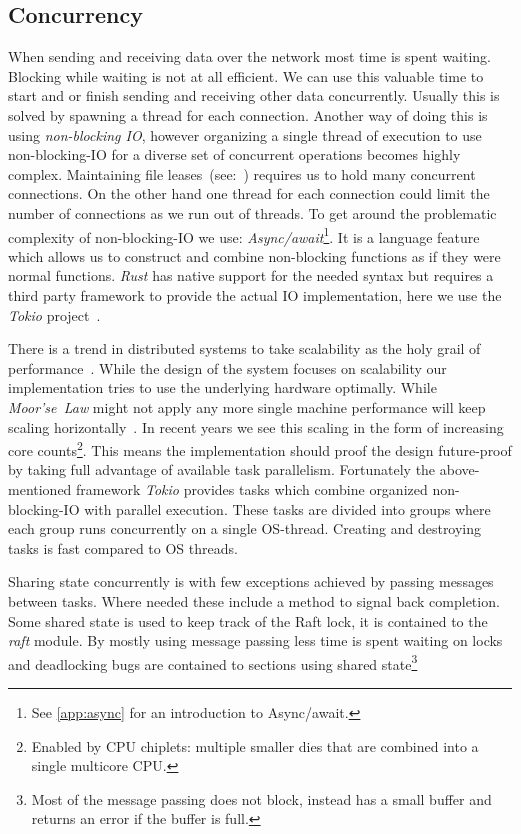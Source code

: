 \subsection{Concurrency}
When sending and receiving data over the network most time is spent waiting. Blocking while waiting is not at all efficient. We can use this valuable time to start and or finish sending and receiving other data concurrently. Usually this is solved by spawning a thread for each connection. Another way of doing this is using \textit{non-blocking IO}, however organizing a single thread of execution to use non-blocking-IO for a diverse set of concurrent operations becomes highly complex. 
Maintaining file leases~(see:~) requires us to hold many concurrent connections. On the other hand one thread for each connection could limit the number of connections as we run out of threads. To get around the problematic complexity of non-blocking-IO we use: \textit{Async/await}\footnote{See \cref{app:async} for an introduction to Async/await.}. It is a language feature which allows us to construct and combine non-blocking functions as if they were normal functions. \textit{Rust} has native support for the needed syntax but requires a third party framework to provide the actual IO implementation, here we use the \textit{Tokio} project~\cite{tokio}.

There is a trend in distributed systems to take scalability as the holy grail of performance~\cite{scaling}. While the design of the system focuses on scalability our implementation tries to use the underlying hardware optimally. 
While \textit{Moor'se~Law} might not apply any more single machine performance will keep scaling horizontally~\cite{moore}. In recent years we see this scaling in the form of increasing core counts\footnote{Enabled by CPU chiplets: multiple smaller dies that are combined into a single multicore CPU.}. This means the implementation should proof the design future-proof by taking full advantage of available task parallelism. Fortunately the above-mentioned framework \textit{Tokio} provides tasks which combine organized non-blocking-IO with parallel execution. These tasks are divided into groups where each group runs concurrently on a single OS-thread. Creating and destroying tasks is fast compared to OS threads.

Sharing state concurrently is with few exceptions achieved by passing messages between tasks. Where needed these include a method to signal back completion. Some shared state is used to keep track of the Raft lock, it is contained to the \textsl{raft} module. By mostly using message passing less time is spent waiting on locks and deadlocking bugs are contained to sections using shared state\footnote{Most of the message passing does not block, instead has a small buffer and returns an error if the buffer is full.} 

